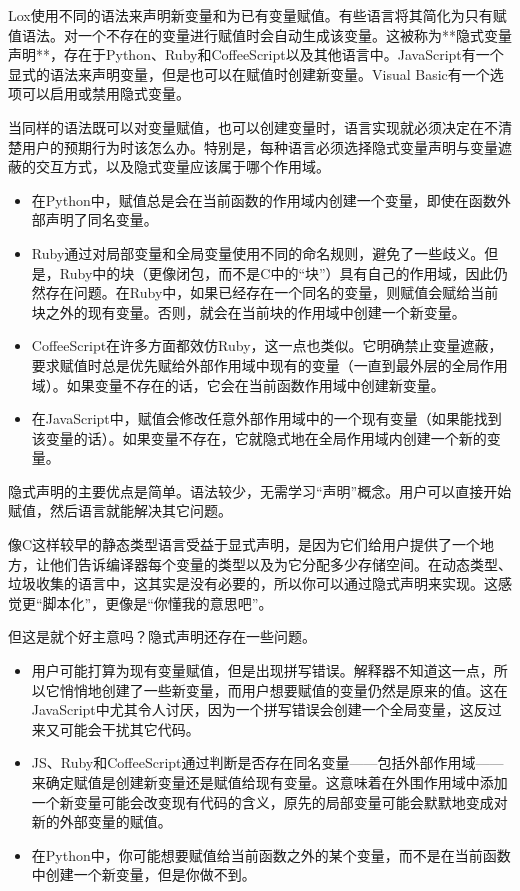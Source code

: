 \documentclass[cn,11pt,chinese]{elegantbook}
\begin{document}
Lox使用不同的语法来声明新变量和为已有变量赋值。有些语言将其简化为只有赋值语法。对一个不存在的变量进行赋值时会自动生成该变量。这被称为**隐式变量声明**，存在于Python、Ruby和CoffeeScript以及其他语言中。JavaScript有一个显式的语法来声明变量，但是也可以在赋值时创建新变量。Visual Basic有一个选项可以启用或禁用隐式变量。

当同样的语法既可以对变量赋值，也可以创建变量时，语言实现就必须决定在不清楚用户的预期行为时该怎么办。特别是，每种语言必须选择隐式变量声明与变量遮蔽的交互方式，以及隐式变量应该属于哪个作用域。

\begin{itemize}
  \item 在Python中，赋值总是会在当前函数的作用域内创建一个变量，即使在函数外部声明了同名变量。
  \item Ruby通过对局部变量和全局变量使用不同的命名规则，避免了一些歧义。但是，Ruby中的块（更像闭包，而不是C中的“块”）具有自己的作用域，因此仍然存在问题。在Ruby中，如果已经存在一个同名的变量，则赋值会赋给当前块之外的现有变量。否则，就会在当前块的作用域中创建一个新变量。
  \item CoffeeScript在许多方面都效仿Ruby，这一点也类似。它明确禁止变量遮蔽，要求赋值时总是优先赋给外部作用域中现有的变量（一直到最外层的全局作用域）。如果变量不存在的话，它会在当前函数作用域中创建新变量。
  \item 在JavaScript中，赋值会修改任意外部作用域中的一个现有变量（如果能找到该变量的话）。如果变量不存在，它就隐式地在全局作用域内创建一个新的变量。
\end{itemize}

隐式声明的主要优点是简单。语法较少，无需学习“声明”概念。用户可以直接开始赋值，然后语言就能解决其它问题。

像C这样较早的静态类型语言受益于显式声明，是因为它们给用户提供了一个地方，让他们告诉编译器每个变量的类型以及为它分配多少存储空间。在动态类型、垃圾收集的语言中，这其实是没有必要的，所以你可以通过隐式声明来实现。这感觉更“脚本化”，更像是“你懂我的意思吧”。

但这是就个好主意吗？隐式声明还存在一些问题。

\begin{itemize}
  \item 用户可能打算为现有变量赋值，但是出现拼写错误。解释器不知道这一点，所以它悄悄地创建了一些新变量，而用户想要赋值的变量仍然是原来的值。这在JavaScript中尤其令人讨厌，因为一个拼写错误会创建一个全局变量，这反过来又可能会干扰其它代码。
  \item JS、Ruby和CoffeeScript通过判断是否存在同名变量——包括外部作用域——来确定赋值是创建新变量还是赋值给现有变量。这意味着在外围作用域中添加一个新变量可能会改变现有代码的含义，原先的局部变量可能会默默地变成对新的外部变量的赋值。
  \item 在Python中，你可能想要赋值给当前函数之外的某个变量，而不是在当前函数中创建一个新变量，但是你做不到。
\end{itemize}
\end{document}
